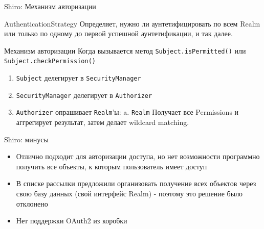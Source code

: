 \documentclass[presentation]{beamer}
\begin{document}
\begin{frame}[label={sec:org44023ca},fragile]{Shiro: Механизм авторизации}
 \begin{block}{AuthenticationStrategy}
Определяет, нужно ли аунтетифицировать по всем Realm или только по одному до первой успешной аунтетификации, и так далее.
\end{block}

\begin{block}{Механизм авторизации}
Когда вызывается метод \texttt{Subject.isPermitted()} или \texttt{Subject.checkPermission()}

\begin{enumerate}
\item \texttt{Subject} делегирует в \texttt{SecurityManager}
\item \texttt{SecurityManager} делегирует в \texttt{Authorizer}
\item \texttt{Authorizer} опрашивает \texttt{Realm}'ы:
a. \texttt{Realm} Получает все Permissions и аггрегирует результат, затем делает wildcard matching.
\end{enumerate}
\end{block}
\end{frame}



\begin{frame}[label={sec:org9649da7}]{Shiro: минусы}
\begin{itemize}
\item Отлично подходит для авторизации доступа, но нет возможности программно получить  все объекты, к которым пользователь имеет доступ
\item В списке рассылки предложили организовать получение всех объектов через свою базу данных (свой интерфейс Realm) - поэтому это решение было отклонено
\item Нет поддержки OAuth2 из коробки
\end{itemize}
\end{frame}
\end{document}
